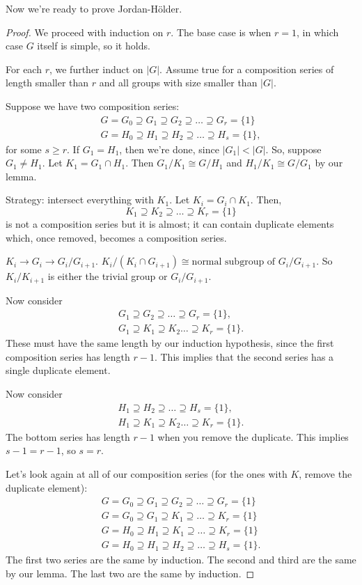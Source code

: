 Now we're ready to prove Jordan-H{\"o}lder.
\begin{proof}
We proceed with induction on $r$. The base case is when $r=1$, in which case $G$ itself is simple, so it holds. 

For each $r$, we further induct on $\vert G\vert$. Assume true for a composition series of length smaller than $r$ and all groups with size smaller than $\vert G\vert$.

Suppose we have two composition series:
\begin{align*}
    G = G_0\supseteq G_1\supseteq G_2\supseteq \hdots \supseteq G_r = \{1\} \\
    G = H_0\supseteq H_1\supseteq H_2\supseteq \hdots \supseteq H_s = \{1\},
\end{align*}
for some $s\geq r$. If $G_1=H_1$, then we're done, since $\vert G_1\vert < \vert G\vert$. So, suppose $G_1\neq H_1$. Let $K_1 = G_1\cap H_1$. Then $G_1/K_1\cong G/H_1$ and $H_1/K_1\cong G/G_1$ by our lemma. 

Strategy: intersect everything with $K_1$. Let $K_i = G_i\cap K_1$. Then,
\[K_1\supseteq K_2\supseteq \hdots \supseteq K_r = \{1\}\]
is not a composition series but it is almost; it can contain duplicate elements which, once removed, becomes a composition series.

$K_i\rightarrow G_i\rightarrow G_i/G_{i+1}$. $K_i/(K_i\cap G_{i+1})\cong \text{normal subgroup of }G_i/G_{i+1}$. So $K_i/K_{i+1}$ is either the trivial group or $G_i/G_{i+1}$.

Now consider
\begin{align*}
    G_1\supseteq G_2\supseteq \hdots \supseteq G_r = \{1\}, \\
    G_1\supseteq K_1\supseteq K_2 \hdots \supseteq K_r = \{1\}.
\end{align*}
These must have the same length by our induction hypothesis, since the first composition series has length $r-1$. This implies that the second series has a single duplicate element.

Now consider
\begin{align*}
    H_1\supseteq H_2\supseteq \hdots \supseteq H_s = \{1\}, \\
    H_1\supseteq K_1\supseteq K_2 \hdots \supseteq K_r = \{1\}.
\end{align*}
The bottom series has length $r-1$ when you remove the duplicate. This implies $s-1=r-1$, so $s=r$. 

Let's look again at all of our composition series (for the ones with $K$, remove the duplicate element): 
\begin{align*}
    G = G_0\supseteq G_1\supseteq G_2\supseteq \hdots \supseteq G_r = \{1\} \\
    G = G_0\supseteq G_1\supseteq K_1\supseteq \hdots \supseteq K_r = \{1\} \\
    G = H_0\supseteq H_1\supseteq K_1\supseteq \hdots \supseteq K_r = \{1\} \\
    G = H_0\supseteq H_1\supseteq H_2\supseteq \hdots \supseteq H_s = \{1\}.
\end{align*}
The first two series are the same by induction. The second and third are the same by our lemma. The last two are the same by induction. 
\end{proof}